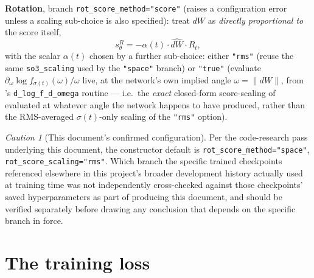 \documentclass[11pt,a4paper]{report}
\theoremstyle{definition}
\theoremstyle{remark}
\newtheorem{caution}[caution]{Caution}
\newcommand{\pyfunc}[1]{\texttt{#1}}
\begin{document}
\textbf{Rotation}, branch \texttt{rot\_score\_method="score"} (raises a
configuration error unless a scaling sub-choice is also specified): treat
$dW$ as \emph{directly proportional to} the score itself,
\begin{equation}
\label{eq:sd-head-rot-score}
s^R_\theta = -\alpha(t)\cdot\widehat{dW}\cdot R_t ,
\end{equation}
with the scalar $\alpha(t)$ chosen by a further sub-choice: either
\texttt{"rms"} (reuse the same \texttt{so3\_scaling} used by the
\texttt{"space"} branch) or \texttt{"true"} (evaluate
$\partial_\omega\log f_{\sigma(t)}(\omega)/\omega$ live, at the network's
own implied angle $\omega=\|dW\|$, from
's \pyfunc{d\_log\_f\_d\_omega} routine ---
i.e.\ the \emph{exact} closed-form score-scaling of
 evaluated at whatever angle the network
happens to have produced, rather than the RMS-averaged $\sigma(t)$-only
scaling of the \texttt{"rms"} option).

\begin{caution}[This document's confirmed configuration]
Per the code-research pass underlying this document, the constructor
default is \texttt{rot\_score\_method="space"},
\texttt{rot\_score\_scaling="rms"}. Which branch the specific trained
checkpoints referenced elsewhere in this project's broader development
history actually used at training time was not independently
cross-checked against those checkpoints' saved hyperparameters as part of
producing this document, and should be verified separately before drawing
any conclusion that depends on the specific branch in force.
\end{caution}

\section{The training loss}
\label{sec:sigmadock-loss}
\end{document}
